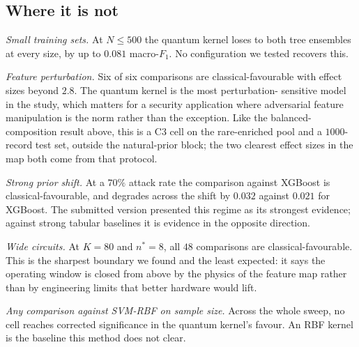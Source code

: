 \subsection{Where it is not}
\begin{revbody}

\emph{Small training sets.} At $N\leq500$ the quantum kernel loses to both tree
ensembles at every size, by up to $0.081$ macro-$F_{1}$. No configuration we
tested recovers this.

\emph{Feature perturbation.} Six of six comparisons are classical-favourable
with effect sizes beyond $2.8$. The quantum kernel is the most perturbation-%
sensitive model in the study, which matters for a security application where
adversarial feature manipulation is the norm rather than the exception. Like
the balanced-composition result above, this is a C3 cell on the rare-enriched
pool and a $1000$-record test set, outside the natural-prior block; the two
clearest effect sizes in the map both come from that protocol.

\emph{Strong prior shift.} At a $70\%$ attack rate the comparison against
XGBoost is classical-favourable, and \QSVM{} degrades across the shift by
$0.032$ against $0.021$ for XGBoost. The submitted version presented this regime
as its strongest evidence; against strong tabular baselines it is evidence in
the opposite direction.

\emph{Wide circuits.} At $K=80$ and $n^{\ast}=8$, all $48$ comparisons are
classical-favourable. This is the sharpest boundary we found and the least
expected: it says the operating window is closed from above by the physics of
the feature map rather than by engineering limits that better hardware would
lift.

\emph{Any comparison against SVM-RBF on sample size.} Across the whole sweep, no
cell reaches corrected significance in the quantum kernel's favour. An RBF
kernel is the baseline this method does not clear.
\end{revbody}

